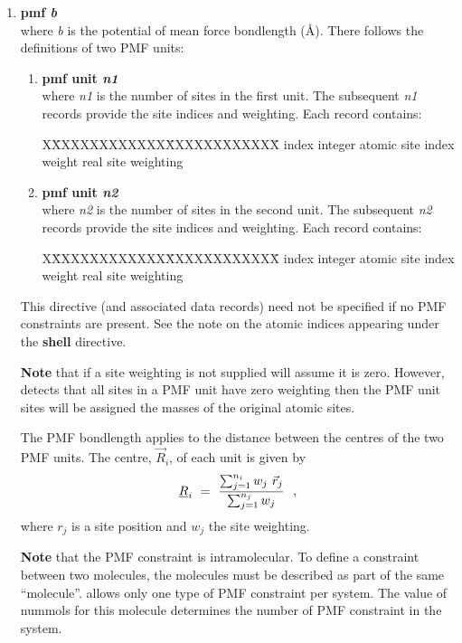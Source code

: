 \begin{enumerate}
\item {\bf pmf {\em b}} \\
where {\em b} is the potential of mean force bondlength (\AA).
There follows the definitions of two PMF units:
\begin{enumerate}
\item {\bf pmf unit {\em n1}} \\
where {\em n1} is the number of sites in the first unit.  The subsequent
{\em n1} records provide the site indices and weighting.  Each record contains:
\begin{tabbing}
X\=XXXXXXXXXXXX\=XXXXXXXXXXXX\=\kill
\> index      \> integer \> atomic site index \\
\> weight     \> real    \> site weighting
\end{tabbing}
\item {\bf pmf unit {\em n2}} \\
where {\em n2} is the number of sites in the second unit.  The subsequent
{\em n2} records provide the site indices and weighting.  Each record contains:
\begin{tabbing}
X\=XXXXXXXXXXXX\=XXXXXXXXXXXX\=\kill
\> index      \> integer \> atomic site index \\
\> weight     \> real    \> site weighting
\end{tabbing}
\end{enumerate}
This directive (and associated data records) need not be specified
if no PMF constraints are present.  See the
note on the atomic indices appearing under the {\bf shell} directive.

{\bf Note} that if a site weighting is not supplied \D will assume
it is zero.  However, \D detects that all sites in a PMF unit have
zero weighting then the PMF unit sites will be assigned the masses
of the original atomic sites.

The PMF bondlength applies to the distance between the centres of the
two PMF units.  The centre, $\vec{R}_{i}$, of each unit is given by
\begin{equation}
\mbox{$\underline{R}$}_{i}~=~\frac{\sum_{j=1}^{n_{i}} w_{j}~\vec{r}_{j}}{\sum_{j=1}^{n_{j}} w_{j}}~~,
\end{equation}
where $r_{j}$ is a site position and $w_{j}$ the site weighting.

{\bf Note} that the PMF constraint is intramolecular.  To define
a constraint between two molecules, the molecules must be described as
part of the same \D ``molecule''.  \D allows only one type of PMF
constraint per system.  The value of nummols for this molecule
determines the number of PMF constraint in the system.


\end{enumerate}
